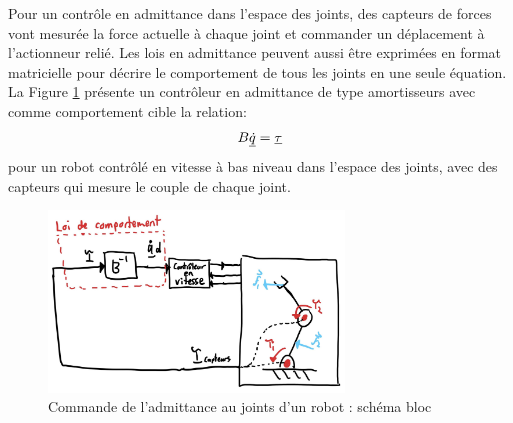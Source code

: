 Pour un contrôle en admittance dans l'espace des joints, des capteurs de forces vont mesurée la force actuelle à chaque joint et commander un déplacement à l'actionneur relié. Les lois en admittance peuvent aussi être exprimées en format matricielle pour décrire le comportement de tous les joints en une seule équation. La Figure \ref{fig:admitancecontroljointspace1} présente un contrôleur en admittance de type amortisseurs avec comme comportement cible la relation:
\begin{align}
B \underline{\dot{q}} = \underline{\tau}
\end{align}
pour un robot contrôlé en vitesse à bas niveau dans l'espace des joints, avec des capteurs qui mesure le couple de chaque joint. 
\begin{figure}[th]
	\centering
		\includegraphics[width=0.70\textwidth]{fig/admitancecontroljointspace1.jpg}
	\caption{Commande de l'admittance au joints d'un robot : schéma bloc}
	\label{fig:admitancecontroljointspace1}
\end{figure}

